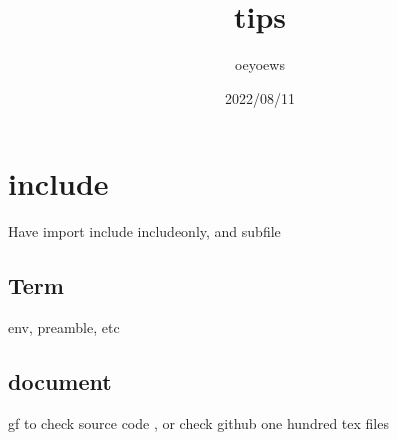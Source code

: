 \documentclass[UTF8]{article}
\title{tips}
\author{oeyoews}
\date{2022/08/11}
\begin{document}
\maketitle

\section{include}%
\label{sec:include}
Have import include includeonly, and subfile

\subsection{Term}%
\label{sec:term}
env, preamble, etc

\subsection{document}%
\label{sec:document}
gf to check source code , or check github one hundred tex files
\end{document}
